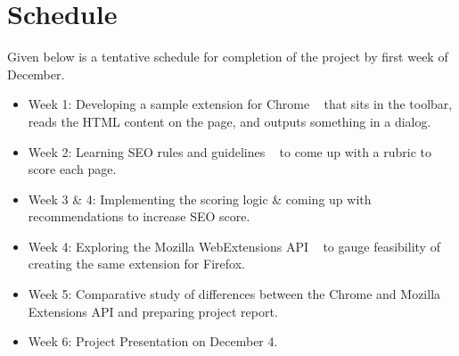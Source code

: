 \documentclass{article}
\begin{document}
\section{Schedule}
Given below is a tentative schedule for completion of the project by first week of December.

\begin{itemize}
  \item {Week 1: Developing a sample extension for Chrome ~\cite{gExt} that sits in the toolbar, reads the HTML content on the page, and outputs something in a dialog.}
  \item {Week 2: Learning SEO rules and guidelines ~\cite{seo} to come up with a rubric to score each page.}
  \item {Week 3 \& 4: Implementing the scoring logic \& coming up with recommendations to increase SEO score.}
  \item {Week 4: Exploring the Mozilla WebExtensions API ~\cite{fExt} to gauge feasibility of creating the same extension for Firefox.}
  \item {Week 5: Comparative study of differences between the Chrome and Mozilla Extensions API and preparing project report.}
  \item {Week 6: Project Presentation on December 4.}
\end{itemize}

\smallskip


%

\end{document}
